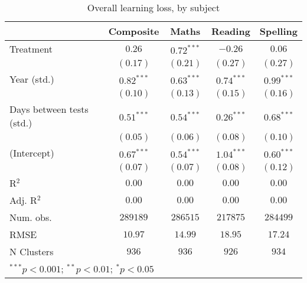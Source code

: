 
\begin{table}
\begin{center}
\begin{tabular}{l c c c c}
\hline
 & Composite & Maths & Reading & Spelling \\
\hline
Treatment                 & $0.26$       & $0.72^{***}$ & $-0.26$      & $0.06$       \\
                          & $(0.17)$     & $(0.21)$     & $(0.27)$     & $(0.27)$     \\
Year (std.)               & $0.82^{***}$ & $0.63^{***}$ & $0.74^{***}$ & $0.99^{***}$ \\
                          & $(0.10)$     & $(0.13)$     & $(0.15)$     & $(0.16)$     \\
Days between tests (std.) & $0.51^{***}$ & $0.54^{***}$ & $0.26^{***}$ & $0.68^{***}$ \\
                          & $(0.05)$     & $(0.06)$     & $(0.08)$     & $(0.10)$     \\
(Intercept)               & $0.67^{***}$ & $0.54^{***}$ & $1.04^{***}$ & $0.60^{***}$ \\
                          & $(0.07)$     & $(0.07)$     & $(0.08)$     & $(0.12)$     \\
\hline
R$^2$                     & $0.00$       & $0.00$       & $0.00$       & $0.00$       \\
Adj. R$^2$                & $0.00$       & $0.00$       & $0.00$       & $0.00$       \\
Num. obs.                 & $289189$     & $286515$     & $217875$     & $284499$     \\
RMSE                      & $10.97$      & $14.99$      & $18.95$      & $17.24$      \\
N Clusters                & $936$        & $936$        & $926$        & $934$        \\
\hline
\multicolumn{5}{l}{\scriptsize{$^{***}p<0.001$; $^{**}p<0.01$; $^{*}p<0.05$}}
\end{tabular}
\caption{Overall learning loss, by subject}
\label{table:overall}
\end{center}
\end{table}
